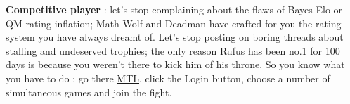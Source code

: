 \textbf{Competitive player} : let's stop complaining about the flaws of Bayes Elo or QM rating inflation; Math Wolf and Deadman have crafted for you the rating system you have always dreamt of. Let's stop posting on boring threads about stalling and undeserved trophies; the only reason Rufus has been no.1 for 100 days is because you weren't there to kick him of his throne.
So you know what you have to do : go there \href{https://www.warlight-mtl.com/}{MTL}, click the Login button, choose a number of simultaneous games and join the fight.


